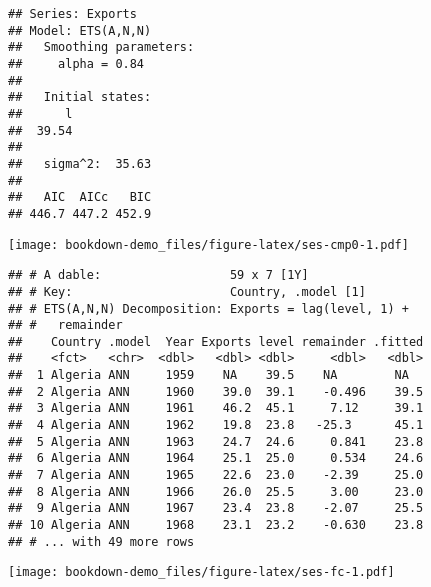 \documentclass[]{book}
\newenvironment{Shaded}{\begin{snugshade}}{\end{snugshade}}
\newcommand{\DataTypeTok}[1]{\textcolor[rgb]{0.13,0.29,0.53}{#1}}
\newcommand{\DecValTok}[1]{\textcolor[rgb]{0.00,0.00,0.81}{#1}}
\newcommand{\KeywordTok}[1]{\textcolor[rgb]{0.13,0.29,0.53}{\textbf{#1}}}
\newcommand{\NormalTok}[1]{#1}
\newcommand{\OperatorTok}[1]{\textcolor[rgb]{0.81,0.36,0.00}{\textbf{#1}}}
\newcommand{\StringTok}[1]{\textcolor[rgb]{0.31,0.60,0.02}{#1}}
\begin{document}
\begin{verbatim}
## Series: Exports 
## Model: ETS(A,N,N) 
##   Smoothing parameters:
##     alpha = 0.84 
## 
##   Initial states:
##      l
##  39.54
## 
##   sigma^2:  35.63
## 
##   AIC  AICc   BIC 
## 446.7 447.2 452.9
\end{verbatim}

\begin{Shaded}
\end{Shaded}

\texttt{[image: bookdown-demo\_files/figure-latex/ses-cmp0-1.pdf]}

\begin{Shaded}
\end{Shaded}

\begin{verbatim}
## # A dable:                  59 x 7 [1Y]
## # Key:                      Country, .model [1]
## # ETS(A,N,N) Decomposition: Exports = lag(level, 1) +
## #   remainder
##    Country .model  Year Exports level remainder .fitted
##    <fct>   <chr>  <dbl>   <dbl> <dbl>     <dbl>   <dbl>
##  1 Algeria ANN     1959    NA    39.5    NA        NA  
##  2 Algeria ANN     1960    39.0  39.1    -0.496    39.5
##  3 Algeria ANN     1961    46.2  45.1     7.12     39.1
##  4 Algeria ANN     1962    19.8  23.8   -25.3      45.1
##  5 Algeria ANN     1963    24.7  24.6     0.841    23.8
##  6 Algeria ANN     1964    25.1  25.0     0.534    24.6
##  7 Algeria ANN     1965    22.6  23.0    -2.39     25.0
##  8 Algeria ANN     1966    26.0  25.5     3.00     23.0
##  9 Algeria ANN     1967    23.4  23.8    -2.07     25.5
## 10 Algeria ANN     1968    23.1  23.2    -0.630    23.8
## # ... with 49 more rows
\end{verbatim}

\begin{Shaded}
\end{Shaded}

\texttt{[image: bookdown-demo\_files/figure-latex/ses-fc-1.pdf]}


\end{document}
